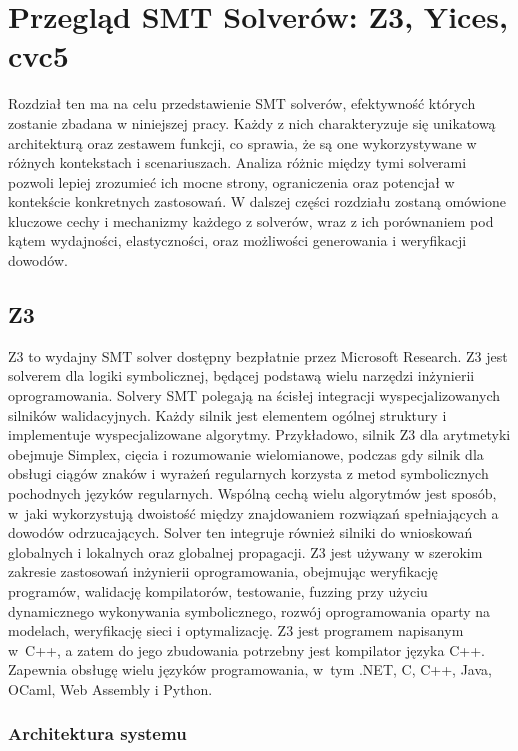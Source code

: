  \chapter{Przegląd SMT Solverów: Z3, Yices, cvc5}
Rozdział ten ma na celu przedstawienie SMT solverów, efektywność których zostanie zbadana w niniejszej pracy. Każdy z nich charakteryzuje się unikatową architekturą oraz zestawem funkcji, co sprawia, że są one wykorzystywane w różnych kontekstach i scenariuszach. Analiza różnic między tymi solverami pozwoli lepiej zrozumieć ich mocne strony, ograniczenia oraz potencjał w kontekście konkretnych zastosowań. W dalszej części rozdziału zostaną omówione kluczowe cechy i mechanizmy każdego z solverów, wraz z ich porównaniem pod kątem wydajności, elastyczności, oraz możliwości generowania i weryfikacji dowodów.

\section{Z3}
Z3 to wydajny SMT solver dostępny bezpłatnie przez Microsoft Research. Z3 jest solverem dla logiki symbolicznej, będącej podstawą wielu narzędzi inżynierii oprogramowania. Solvery SMT polegają na ścisłej integracji wyspecjalizowanych silników walidacyjnych. Każdy silnik jest elementem ogólnej struktury i implementuje wyspecjalizowane algorytmy. Przykładowo, silnik Z3 dla arytmetyki obejmuje Simplex, cięcia i rozumowanie wielomianowe, podczas gdy silnik dla obsługi ciągów znaków i wyrażeń regularnych korzysta z metod symbolicznych pochodnych języków regularnych. Wspólną cechą wielu algorytmów jest sposób, w~jaki wykorzystują dwoistość między znajdowaniem rozwiązań spełniających a dowodów odrzucających. Solver ten integruje również silniki do wnioskowań globalnych i lokalnych oraz globalnej propagacji.
Z3 jest używany w szerokim zakresie zastosowań inżynierii oprogramowania, obejmując weryfikację programów, walidację kompilatorów, testowanie, fuzzing przy użyciu dynamicznego wykonywania symbolicznego, rozwój oprogramowania oparty na modelach, weryfikację sieci i optymalizację.
Z3 jest programem napisanym w~C++, a zatem do jego zbudowania potrzebny jest kompilator języka C++. Zapewnia obsługę wielu języków programowania, w~tym .NET, C, C++, Java, OCaml, Web Assembly i Python.

\subsection{Architektura systemu}

